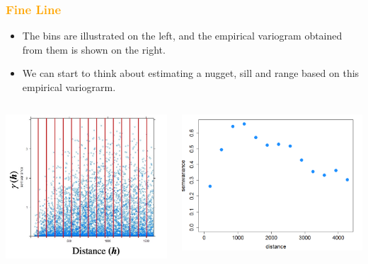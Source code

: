 \documentclass[parskip,12pt]{beamer}
\begin{document}
\begin{frame}
\frametitle{\textcolor{orange}{Fine Line}}
 \begin{itemize}
\item The bins are illustrated on the left, and the empirical variogram obtained from them is shown on the right.
\vspace{3mm}
\item We can start to think about estimating a nugget, sill and range based on this empirical variograrm.
\end{itemize}
\begin{columns}
\begin{column}{0.47\textwidth}
    \begin{center}
     \includegraphics[width=\textwidth]{MeuseBinned}
          \end{center}
\end{column}
\begin{column}{0.53\textwidth}
    \begin{center}
     \includegraphics[width=\textwidth]{MeuseEmpirical}

\end{center}
\end{column}
\end{columns}
\end{frame}
\end{document}
